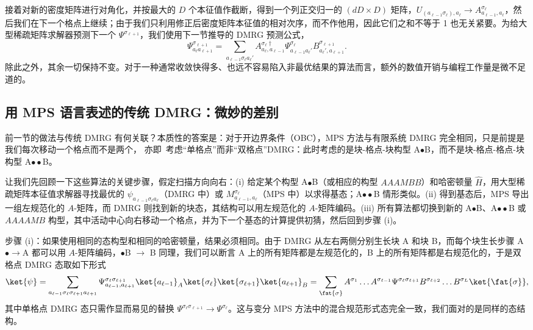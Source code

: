 接着对新的密度矩阵进行对角化，并按最大的 $D$ 个本征值作截断，得到一个列正交归一的 $(dD \times D)$ 矩阵，$U_{(a_{\ell-1}\sigma_{\ell}), a_{\ell}} \rightarrow A^{\sigma_{\ell}}_{a_{\ell-1}, a_{\ell}}$，然后我们在下一个格点上继续；由于我们只利用修正后密度矩阵本征值的相对次序，而不作他用，因此它们之和不等于 1 也无关紧要。为给大型稀疏矩阵求解器预测下一个 $\Psi^{\sigma_{\ell+1}}$，我们使用下一节推导的 DMRG 预测公式，
\begin{equation}
\Psi^{\sigma_{\ell+1}}_{a_{\ell}a_{\ell+1}} = 
\sum_{a_{\ell-1}\sigma_{\ell} a_{\ell}'} 
A^{\sigma_{\ell} \dagger}_{a_{\ell},a_{\ell-1}} \Psi^{\sigma_{\ell}}_{a_{\ell-1}a_{\ell}'}  B^{\sigma_{\ell+1}}_{a_{\ell}', a_{\ell+1}} .
\end{equation}
除此之外，其余一切保持不变。对于一种通常收敛快得多、也远不容易陷入非最优结果的算法而言，额外的数值开销与编程工作量是微不足道的。

\subsection{用 MPS 语言表述的传统 DMRG：微妙的差别}   
\label{subsec:conventionalDMRGinMPS}
前一节的做法与传统 DMRG 有何关联？本质性的答案是：对于开边界条件（OBC），MPS 方法与有限系统 DMRG 完全相同，只是前提是我们每次移动一个格点而不是两个，
亦即\ 考虑``单格点''而非``双格点''DMRG：此时考虑的是块-格点-块构型 A$\bullet$B，而不是块-格点-格点-块构型 A$\bullet\bullet$B。

让我们先回顾一下这些算法的关键步骤，假定扫描方向向右：(i) 给定某个构型 A$\bullet$B（或相应的构型 $AAAMBB$）和哈密顿量 $\hat{H}$，用大型稀疏矩阵本征值求解器寻找最优的 $\psi_{a_{\ell-1} \sigma_\ell a_\ell}$（DMRG 中）或 $M^{\sigma_\ell}_{a_{\ell-1}, a_\ell}$（MPS 中）以求得基态；A$\bullet\bullet$B 情形类似。(ii) 得到基态后，MPS 导出一组左规范化的 $A$-矩阵，而 DMRG 则找到新的块态，其结构可以用左规范化的 $A$-矩阵编码。(iii) 所有算法都切换到新的 A$\bullet$B、A$\bullet\bullet$B 或 $AAAAMB$ 构型，其中活动中心向右移动一个格点，并为下一个基态的计算提供初猜，然后回到步骤 (i)。

步骤 (i)：如果使用相同的态构型和相同的哈密顿量，结果必须相同。由于 DMRG 从左右两侧分别生长块 A 和块 B，而每个块生长步骤 A$\bullet \rightarrow$A 都可以用 $A$-矩阵编码，$\bullet$B $\rightarrow$ B 同理，我们可以断言 A 上的所有矩阵都是左规范化的，B 上的所有矩阵都是右规范化的，于是双格点 DMRG 态取如下形式
\begin{equation}
\ket{\psi} = \sum_{a_{\ell-1} \sigma_\ell \sigma_{\ell+1} a_{\ell+1}} \Psi^{\sigma_\ell\sigma_{\ell+1}}_{a_{\ell-1}, a_{\ell+1}} \ket{a_{\ell-1}}_A \ket{\sigma_\ell} \ket{\sigma_{\ell+1}} \ket{a_{\ell+1}}_B = \sum_{\fat{\sigma}} A^{\sigma_1} \ldots A^{\sigma_{\ell-1}} 
\Psi^{\sigma_\ell \sigma_{\ell+1}} B^{\sigma_{\ell+2}} \ldots B^{\sigma_L} \ket{\fat{\sigma}},
\end{equation}
其中单格点 DMRG 态只需作显而易见的替换 $\Psi^{\sigma_\ell\sigma_{\ell+1}} \rightarrow \Psi^{\sigma_\ell}$。这与变分 MPS 方法中的混合规范形式态完全一致，我们面对的是同样的态结构。 


